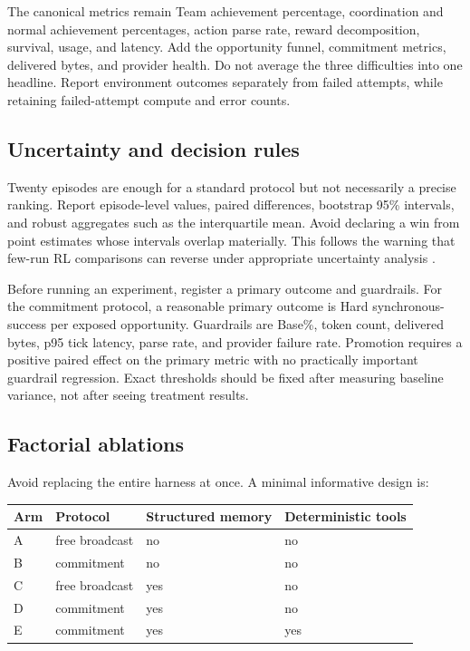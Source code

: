 \documentclass[11pt]{article}
\begin{document}
The canonical metrics remain Team achievement percentage, coordination and normal achievement
percentages, action parse rate, reward decomposition, survival, usage, and latency.  Add the
opportunity funnel, commitment metrics, delivered bytes, and provider health.  Do not average the
three difficulties into one headline.  Report environment outcomes separately from failed attempts,
while retaining failed-attempt compute and error counts.

\subsection{Uncertainty and decision rules}

Twenty episodes are enough for a standard protocol but not necessarily a precise ranking.  Report
episode-level values, paired differences, bootstrap 95\% intervals, and robust aggregates such as the
interquartile mean.  Avoid declaring a win from point estimates whose intervals overlap materially.
This follows the warning that few-run RL comparisons can reverse under appropriate uncertainty
analysis \cite{agarwal2021precipice}.

Before running an experiment, register a primary outcome and guardrails.  For the commitment
protocol, a reasonable primary outcome is Hard synchronous-success per exposed opportunity.
Guardrails are Base\%, token count, delivered bytes, p95 tick latency, parse rate, and provider failure
rate.  Promotion requires a positive paired effect on the primary metric with no practically important
guardrail regression.  Exact thresholds should be fixed after measuring baseline variance, not after
seeing treatment results.

\subsection{Factorial ablations}

Avoid replacing the entire harness at once.  A minimal informative design is:

\begin{center}
\begin{tabular}{llll}
\toprule
Arm & Protocol & Structured memory & Deterministic tools \\
\midrule
A & free broadcast & no & no \\
B & commitment & no & no \\
C & free broadcast & yes & no \\
D & commitment & yes & no \\
E & commitment & yes & yes \\
\bottomrule
\end{tabular}
\end{center}
\end{document}
